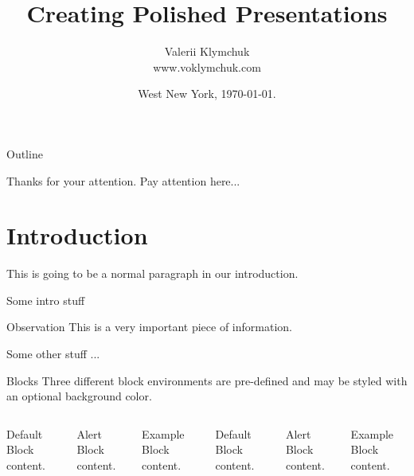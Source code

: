 \documentclass{beamer}
\title{Creating Polished Presentations}
\date{West New York, \today.}
\author{Valerii Klymchuk \\ www.voklymchuk.com}
\institute{Centre for Modern Templates}
\begin{document}
\maketitle


\begin{frame}[allowframebreaks]{Outline}
	\medskip
	\tableofcontents
\end{frame}

\begin{frame}[standout]
	Thanks for your attention.
	Pay attention here...
\end{frame}

\section{Introduction} 

\begin{frame}
	This is going to be a normal paragraph in our introduction.
	
	
		Some intro stuff
		\begin{block}{Observation}
			This is a very important piece of information.
		\end{block}
		Some other stuff ...


\end{frame}


\begin{frame}{Blocks}
	Three different block environments are pre-defined and may be styled with an
	optional background color.
	
	\begin{columns}[T,onlytextwidth]
		\begin{block}{Default}
			Block content.
		\end{block}
		
		\begin{alertblock}{Alert}
			Block content.
		\end{alertblock}
		
		\begin{exampleblock}{Example}
			Block content.
		\end{exampleblock}
		
		
		
		\begin{block}{Default}
			Block content.
		\end{block}
		
		\begin{alertblock}{Alert}
			Block content.
		\end{alertblock}
		
		\begin{exampleblock}{Example}
			Block content.
		\end{exampleblock}
		
	\end{columns}
\end{frame}
\end{document}
